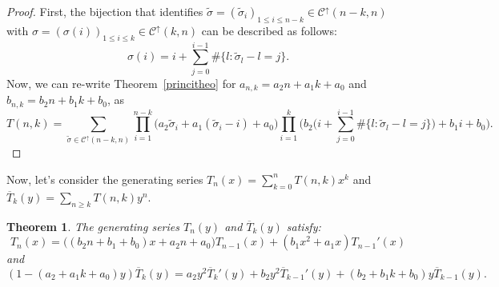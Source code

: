 \documentclass[12pt,a4paper]{article}
\newtheorem{theorem}{Theorem}[section]
\theoremstyle{definition} %
\theoremstyle{remark}
\theoremstyle{examples}
\newenvironment{porofo}[1][Proof]{%
	\begin{proof}[#1]%
	}{%
	\end{proof}%
}
\newcommand{\suit}[1]{{#1}(n,k)}
\begin{document}
\begin{porofo}
	First, the bijection that identifies $\tilde{\sigma}=(\tilde{\sigma}_i)_{1\leq i \leq n-k} \in \mathcal{C}^\uparrow(n-k,n)$ with $\sigma=(\sigma(i))_{1\leq i\leq k}\in\mathcal{C}^\uparrow(k,n)$ can be described as follows:
	\[
	\sigma(i)= i+\sum_{j=0}^{i-1} \# \{l: \tilde{\sigma}_l-l=j\}.
	\]
	Now, we can re-write Theorem~\ref{princitheo} for $a_{n,k}=a_2n+a_1k+a_0$ and $b_{n,k}=b_2n+b_1k+b_0$, as 
	\[
	\suit{T}
	=\sum_{\tilde{\sigma} \in \mathcal{C}^\uparrow(n-k,n)}
	\prod_{i=1}^{n-k} \big( a_2 \tilde{\sigma}_i+a_1(\tilde{\sigma}_i-i)+a_0 \big)
	\prod_{i=1}^{k} \Big( b_2\big(i+\sum_{j=0}^{i-1} \# \{l: \tilde{\sigma}_l-l=j\}\big)+b_1 i+b_0 \Big).
	\]
\end{porofo}

\noindent Now,  let's consider the generating series $T_n(x)=\sum_{k=0}^nT(n,k)x^k$ and $\overline{T}_k(y)=\sum_{n\geq k}T(n,k)y^n.$
\begin{theorem}
	The generating series $T_n(y)$ and $\overline{T}_k(y)$ satisfy:
	\begin{equation}
	T_n(x)=\big((b_2n+b_1+b_0)x+a_2n+a_0\big)T_{n-1}(x)+(b_1x^2+a_1x)T_{n-1}'(x)
	\end{equation} 
	and 
	\begin{equation}
	(1-(a_2+a_1k+a_0)y)\overline{T}_k(y)=a_2y^2\overline{T}_k'(y)+b_2y^2\overline{T}_{k-1}'(y)+(b_2+b_1k+b_0)y\overline{T}_{k-1}(y).
	\end{equation}
\end{theorem}
\end{document}
